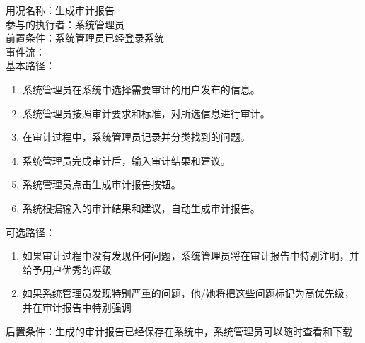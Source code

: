 \begin{framed}
\noindent
用况名称：生成审计报告\\
参与的执行者：系统管理员\\
前置条件：系统管理员已经登录系统\\
事件流：\\
基本路径：
\begin{enumerate}[itemsep=2pt,topsep=0pt,parsep=0pt,itemindent=1em]
    \item 系统管理员在系统中选择需要审计的用户发布的信息。
    \item 系统管理员按照审计要求和标准，对所选信息进行审计。
    \item 在审计过程中，系统管理员记录并分类找到的问题。
    \item 系统管理员完成审计后，输入审计结果和建议。
    \item 系统管理员点击生成审计报告按钮。
    \item 系统根据输入的审计结果和建议，自动生成审计报告。
    \end{enumerate}
\noindent
可选路径：\par
   \begin{enumerate}[itemsep=2pt,topsep=0pt,parsep=0pt,itemindent=1em]  
       \item 如果审计过程中没有发现任何问题，系统管理员将在审计报告中特别注明，并给予用户优秀的评级
       \item 如果系统管理员发现特别严重的问题，他/她将把这些问题标记为高优先级，并在审计报告中特别强调
   \end{enumerate} 
后置条件：生成的审计报告已经保存在系统中，系统管理员可以随时查看和下载
\end{framed}